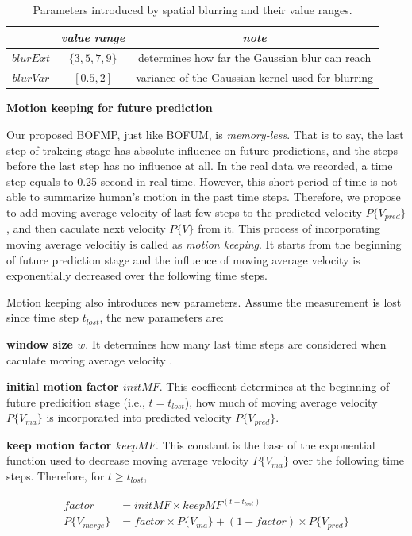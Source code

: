 \begin{table}[H]
\centering  
\begin{tabularx}{.8\textwidth}{c|c|c}
    \hline
      &  \textit{value range } & \textit{note} \\ \hline
    \( blurExt \) & \( \{3, 5, 7, 9\} \) & \footnotesize{determines how far the Gaussian blur can reach} \\
     \( blurVar \) & \( [0.5, 2]\) & \footnotesize{ variance of the Gaussian kernel used for blurring} \\   
   \hline
  \end{tabularx}
\label{table:spatial_blur_param_range}
\caption{Parameters introduced by spatial blurring and their value ranges.}
\end{table}

\textbf{Motion keeping for future prediction}

Our proposed BOFMP, just like BOFUM, is \textit{memory-less}. That is to say, the last step of trakcing stage has absolute influence on future predictions, and the steps before the last step has no influence at all. In the real data we recorded, a time step equals to 0.25 second in real time. However, this short period of time is not able to summarize human's motion in the past time steps. Therefore, we propose to add moving average velocity of last few steps to the predicted velocity $P\{V_{pred}\}$, and then caculate next velocity $P\{ V \}$ from it. This process of incorporating moving average velocitiy is called as \textit{motion keeping}. It starts from the beginning of future prediction stage and the influence of moving average velocity is exponentially decreased over the following time steps.

Motion keeping also introduces new parameters. Assume the measurement is lost since time step $t_{lost}$, the new parameters are: 
\begin{my_enumerate}
\item \textbf{window size $w$}. It determines how many last time steps are considered when caculate moving average velocity .
\item \textbf{initial motion factor \( initMF\)}. This coefficent determines at the beginning of future predicition stage (i.e., $t=t_{lost}$), how much of moving average velocity $P\{V_{ma}\}$ is incorporated into predicted velocity $P\{V_{pred}\}$. 
\item \textbf{keep motion factor \( keepMF \)}. This constant is the base of the exponential function used to decrease moving average velocity $P\{V_{ma}\}$ over the following time steps. Therefore, for $t \geq t_{lost}$, 

\begin{align}
factor &= initMF \times keepMF^{(t-t_{lost})} \\
P\{V_{merge}\} &= factor \times P\{V_{ma}\} + (1-factor) \times P\{V_{pred}\}
\end{align}

\end{my_enumerate}

